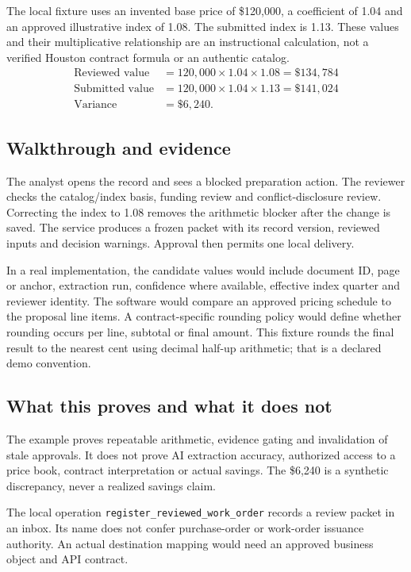 \documentclass[11pt,letterpaper]{article}
\newcommand{\code}[1]{\texttt{\small #1}}
\begin{document}
The local fixture uses an invented base price of \$120,000, a coefficient of 1.04 and an approved illustrative index of 1.08. The submitted index is 1.13. These values and their multiplicative relationship are an instructional calculation, not a verified Houston contract formula or an authentic catalog.
\begin{align*}
\text{Reviewed value} &= 120{,}000\times1.04\times1.08=\$134{,}784\\
\text{Submitted value} &= 120{,}000\times1.04\times1.13=\$141{,}024\\
\text{Variance} &= \$6{,}240.
\end{align*}

\subsection{Walkthrough and evidence}
The analyst opens the record and sees a blocked preparation action. The reviewer checks the catalog/index basis, funding review and conflict-disclosure review. Correcting the index to 1.08 removes the arithmetic blocker after the change is saved. The service produces a frozen packet with its record version, reviewed inputs and decision warnings. Approval then permits one local delivery.

In a real implementation, the candidate values would include document ID, page or anchor, extraction run, confidence where available, effective index quarter and reviewer identity. The software would compare an approved pricing schedule to the proposal line items. A contract-specific rounding policy would define whether rounding occurs per line, subtotal or final amount. This fixture rounds the final result to the nearest cent using decimal half-up arithmetic; that is a declared demo convention.

\subsection{What this proves and what it does not}
The example proves repeatable arithmetic, evidence gating and invalidation of stale approvals. It does not prove AI extraction accuracy, authorized access to a price book, contract interpretation or actual savings. The \$6,240 is a synthetic discrepancy, never a realized savings claim.

The local operation \code{register\_reviewed\_work\_order} records a review packet in an inbox. Its name does not confer purchase-order or work-order issuance authority. An actual destination mapping would need an approved business object and API contract.
\end{document}
